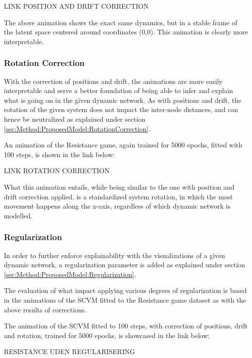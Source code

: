 LINK POSITION AND DRIFT CORRECTION

The above animation shows the exact same dynamics, but in a stable frame of the latent space centered around coordinates (0,0).
This animation is clearly more interpretable.


\subsubsection{Rotation Correction}
\label{sec:ResearchQuestion3:RotationCorrection}
With the correction of positions and drift, the animations are more easily interpretable and serve a better foundation of being able to infer and explain what is going on in the given dynamic network.
As with positions and drift, the rotation of the given system does not impact the inter-node distances, and can hence be neutralized as explained under section \ref{sec:Method:ProposedModel:RotationCorrection}.

An animation of the Resistance game, again trained for 5000 epochs, fitted with 100 steps, is shown in the link below:

LINK ROTATION CORRECTION

What this animation entails, while being similar to the one with position and drift correction applied, is a standardized system rotation, in which the most movement happens along the x-axis, regardless of which dynamic network is modelled.




\subsubsection{Regularization}
\label{sec:ResearchQuestion3:Regularization}
In order to further enforce explainability with the visualizations of a given dynamic network, a regularization parameter is added as explained under section \ref{sec:Method:ProposedModel:Regularization}.

The evaluation of what impact applying various degrees of regularization is based in the animations of the SCVM fitted to the Resistance game dataset as with the above results of corrections.

The animation of the SCVM fitted to 100 steps, with correction of positions, drift and rotation, trained for 5000 epochs, is showcased in the link below:

RESISTANCE UDEN REGULARISERING

